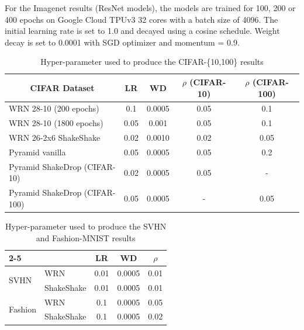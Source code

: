 \documentclass{article} %
\begin{document}
For the Imagenet results (ResNet models), the models are trained for 100, 200 or 400 epochs on Google Cloud TPUv3 32 cores with a batch size of 4096. The initial learning rate is set to 1.0 and decayed using a cosine schedule. Weight decay is set to 0.0001 with SGD optimizer and momentum = 0.9.

\begin{table}[h]
\centering
\caption{Hyper-parameter used to produce the CIFAR-\{10,100\} results}
\label{tab:cifar_hparam}
\begin{tabular}{|l|cccc|}
\hline

\multicolumn{1}{|c|}{CIFAR Dataset} & LR   & WD     & $\rho$ (CIFAR-10) & $\rho$ (CIFAR-100) \\ \hline
WRN 28-10 (200 epochs)              & 0.1  & 0.0005 & 0.05          & 0.1            \\
WRN 28-10 (1800 epochs)             & 0.05 & 0.001  & 0.05          & 0.1            \\
WRN 26-2x6 ShakeShake             & 0.02 & 0.0010 & 0.02          & 0.05           \\
Pyramid vanilla                     & 0.05 & 0.0005 & 0.05          & 0.2            \\
Pyramid ShakeDrop (CIFAR-10)         & 0.02 & 0.0005 & 0.05          & -              \\
Pyramid ShakeDrop (CIFAR-100)        & 0.05 & 0.0005 & -             & 0.05           \\ \hline
\end{tabular}
\end{table}

\begin{table}[h]
\centering
\caption{Hyper-parameter used to produce the SVHN and Fashion-MNIST results}
\label{tab:mnist_hparam}
\centering
\begin{tabular}{l|lccc|}
\cline{2-5}
                                               &            & LR   & WD     & $\rho$  \\ \hline
\multicolumn{1}{|l|}{\multirow{2}{*}{SVHN}}    & WRN        & 0.01 & 0.0005 & 0.01 \\
\multicolumn{1}{|l|}{}                         & ShakeShake & 0.01 & 0.0005 & 0.01 \\ \hline
\multicolumn{1}{|l|}{\multirow{2}{*}{Fashion}} & WRN        & 0.1  & 0.0005 & 0.05 \\
\multicolumn{1}{|l|}{}                         & ShakeShake & 0.1  & 0.0005 & 0.02 \\ \hline
\end{tabular}
\end{table}
\end{document}
